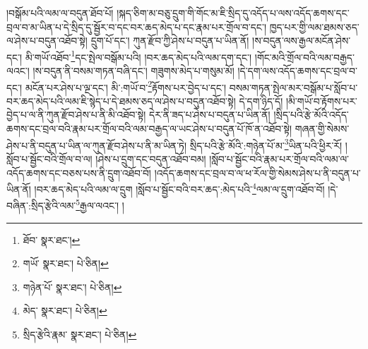 །བསྒོམ་པའི་ལམ་ལ་བདུན་ཐོབ་པོ། །སྐད་ཅིག་མ་བཅུ་དྲུག་གི་གོང་མ་ཇི་སྲིད་དུ་འདོད་པ་ལས་འདོད་ཆགས་དང་བྲལ་བ་མ་ཡིན་པ་དེ་སྲིད་དུ་སྦྱོར་བ་དང་བར་ཆད་མེད་པ་དང་རྣམ་པར་གྲོལ་བ་དང་། ཁྱད་པར་གྱི་ལམ་ཐམས་ཅད་ལ་ཤེས་པ་བདུན་འཐོབ་སྟེ། དྲུག་པོ་དང་། ཀུན་རྫོབ་ཀྱི་ཤེས་པ་བདུན་པ་ཡིན་ནོ། །ས་བདུན་ལས་རྒྱལ་མངོན་ཤེས་དང་། མི་གཡོ་འཐོབ་\footnote{ཐོབ་  སྣར་ཐང་། }དང་སྤེལ་བསྒོམ་པའི། །བར་ཆད་མེད་པའི་ལམ་དག་དང་། །གོང་མའི་གྲོལ་བའི་ལམ་བརྒྱད་ལའང་། །ས་བདུན་ནི་བསམ་གཏན་བཞི་དང་། གཟུགས་མེད་པ་གསུམ་མོ། །དེ་དག་ལས་འདོད་ཆགས་དང་བྲལ་བ་དང་། མངོན་པར་ཤེས་པ་ལྔ་དང་། མི་:གཡོ་བ་\footnote{གཡོ་  སྣར་ཐང་།  པེ་ཅིན། }རྟོགས་པར་བྱེད་པ་དང་། བསམ་གཏན་སྤེལ་མར་བསྒོམ་པ་སློབ་པ་བར་ཆད་མེད་པའི་ལམ་ཇི་སྙེད་པ་དེ་ཐམས་ཅད་ལ་ཤེས་པ་བདུན་འཐོབ་སྟེ། དེ་དག་ཉིད་དོ། །མི་གཡོ་བ་རྟོགས་པར་བྱེད་པ་ལ་ནི་ཀུན་རྫོབ་ཤེས་པ་ནི་མི་འཐོབ་སྟེ། དེར་ནི་ཟད་པ་ཤེས་པ་བདུན་པ་ཡིན་ནོ། །སྲིད་པའི་རྩེ་མོའི་འདོད་ཆགས་དང་བྲལ་བའི་རྣམ་པར་གྲོལ་བའི་ལམ་བརྒྱད་ལ་ཡང་ཤེས་པ་བདུན་པོ་ཁོ་ན་འཐོབ་སྟེ། གཞན་གྱི་སེམས་ཤེས་པ་ནི་བདུན་པ་ཡིན་ལ་ཀུན་རྫོབ་ཤེས་པ་ནི་མ་ཡིན་ཏེ། སྲིད་པའི་རྩེ་མོའི་:གཉེན་པོ་མ་\footnote{གཉེན་པོ་  སྣར་ཐང་།  པེ་ཅིན། }ཡིན་པའི་ཕྱིར་རོ། །སློབ་པ་སྦྱོང་བའི་གྲོལ་བ་ལ། །ཤེས་པ་དྲུག་དང་བདུན་འཐོབ་བམ། །སློབ་པ་སྦྱོང་བའི་རྣམ་པར་གྲོལ་བའི་ལམ་ལ་འདོད་ཆགས་དང་བཅས་པས་ནི་དྲུག་འཐོབ་བོ། །འདོད་ཆགས་དང་བྲལ་བ་ལ་ཕ་རོལ་གྱི་སེམས་ཤེས་པ་ནི་བདུན་པ་ཡིན་ནོ། །བར་ཆད་མེད་པའི་ལམ་ལ་དྲུག །སློབ་པ་སྦྱོང་བའི་བར་ཆད་:མེད་པའི་\footnote{མེད་  སྣར་ཐང་།  པེ་ཅིན། }ལམ་ལ་དྲུག་འཐོབ་བོ། །དེ་བཞིན་:སྲིད་རྩེའི་ལམ་\footnote{སྲིད་རྩེའི་རྣམ་  སྣར་ཐང་།  པེ་ཅིན། }རྒྱལ་ལའང་། །
